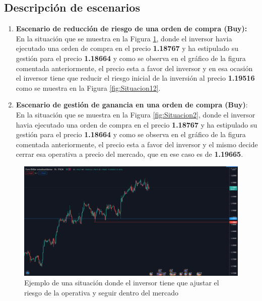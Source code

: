 \subsection{Descripción de escenarios}
\begin{enumerate}
	\item  \textbf{Escenario de reducción de riesgo de una orden de compra (Buy):} En la situación que se muestra en la Figura \ref{fig:Situacion1}, donde el inversor havia ejecutado una orden de compra en el precio \textbf{1.18767} y ha estipulado su gestión para el precio \textbf{1.18664} y como se observa en el gráfico de la figura comentada anteriormente, el precio esta a favor del inversor y en esa ocasión el inversor tiene que reducir el riesgo inicial de la inversión al precio \textbf{1.19516} como se muestra en la Figura \ref{fig:Situacion12}.	
	\item  \textbf{Escenario de gestión de ganancia en una orden de compra (Buy)}: En la situación que se muestra en la Figura \ref{fig:Situacion2}, donde el inversor havia ejecutado una orden de compra en el precio \textbf{1.18767} y ha estipulado su gestión para el precio \textbf{1.18664} y como se observa en el gráfico de la figura comentada anteriormente, el precio esta a favor del inversor y el mismo decide cerrar esa operativa a precio del mercado, que en ese caso es de \textbf{1.19665}.	
\end{enumerate}
\begin{figure}[H]
    \centering
    \includegraphics[scale=0.30]{imagenes/Situacion1.png}
    \caption{\label{fig:Situacion1}Ejemplo de una situación donde el inversor tiene que ajustar el riesgo de la operativa y seguir dentro del mercado}
  \end{figure}
